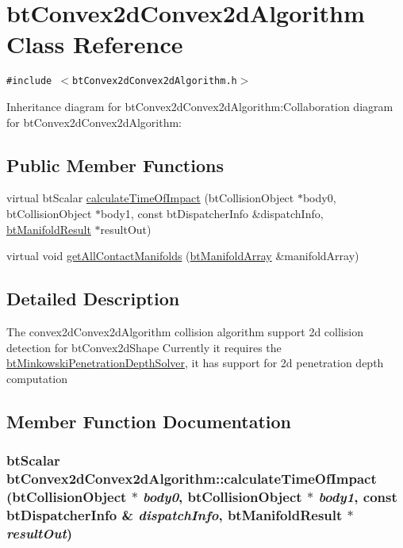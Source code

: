 \hypertarget{classbt_convex2d_convex2d_algorithm}{
\section{btConvex2dConvex2dAlgorithm Class Reference}
\label{classbt_convex2d_convex2d_algorithm}
}
{\tt \#include $<$btConvex2dConvex2dAlgorithm.h$>$}

Inheritance diagram for btConvex2dConvex2dAlgorithm:Collaboration diagram for btConvex2dConvex2dAlgorithm:\subsection*{Public Member Functions}
\begin{CompactItemize}
\item 
virtual btScalar \hyperlink{classbt_convex2d_convex2d_algorithm_32bf85e0246ed54dd41edd861294c37e}{calculateTimeOfImpact} (btCollisionObject $\ast$body0, btCollisionObject $\ast$body1, const btDispatcherInfo \&dispatchInfo, \hyperlink{classbt_manifold_result}{btManifoldResult} $\ast$resultOut)
\item 
virtual void \hyperlink{classbt_convex2d_convex2d_algorithm_de3af2f3f04d9b202535d33550a94be4}{getAllContactManifolds} (\hyperlink{classbt_aligned_object_array}{btManifoldArray} \&manifoldArray)
\end{CompactItemize}


\subsection{Detailed Description}
The convex2dConvex2dAlgorithm collision algorithm support 2d collision detection for btConvex2dShape Currently it requires the \hyperlink{classbt_minkowski_penetration_depth_solver}{btMinkowskiPenetrationDepthSolver}, it has support for 2d penetration depth computation 

\subsection{Member Function Documentation}
\hypertarget{classbt_convex2d_convex2d_algorithm_32bf85e0246ed54dd41edd861294c37e}{
\subsubsection[calculateTimeOfImpact]{\setlength{\rightskip}{0pt plus 5cm}btScalar btConvex2dConvex2dAlgorithm::calculateTimeOfImpact (btCollisionObject $\ast$ {\em body0}, \/  btCollisionObject $\ast$ {\em body1}, \/  const btDispatcherInfo \& {\em dispatchInfo}, \/  {\bf btManifoldResult} $\ast$ {\em resultOut})}}
\label{classbt_convex2d_convex2d_algorithm_32bf85e0246ed54dd41edd861294c37e}




